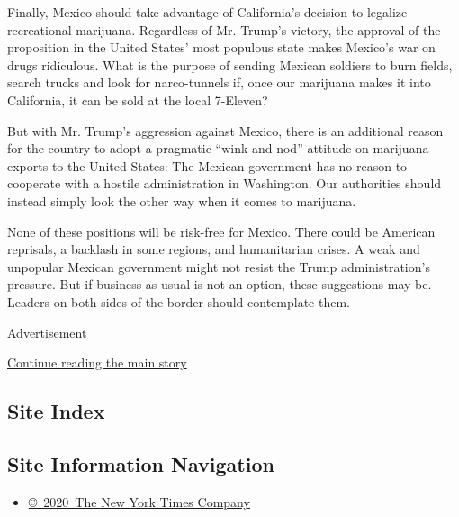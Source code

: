 Finally, Mexico should take advantage of California's decision to
legalize recreational marijuana. Regardless of Mr. Trump's victory, the
approval of the proposition in the United States' most populous state
makes Mexico's war on drugs ridiculous. What is the purpose of sending
Mexican soldiers to burn fields, search trucks and look for
narco-tunnels if, once our marijuana makes it into California, it can be
sold at the local 7-Eleven?

But with Mr. Trump's aggression against Mexico, there is an additional
reason for the country to adopt a pragmatic ``wink and nod'' attitude on
marijuana exports to the United States: The Mexican government has no
reason to cooperate with a hostile administration in Washington. Our
authorities should instead simply look the other way when it comes to
marijuana.

None of these positions will be risk-free for Mexico. There could be
American reprisals, a backlash in some regions, and humanitarian crises.
A weak and unpopular Mexican government might not resist the Trump
administration's pressure. But if business as usual is not an option,
these suggestions may be. Leaders on both sides of the border should
contemplate them.

Advertisement

\protect\hyperlink{after-bottom}{Continue reading the main story}

\hypertarget{site-index}{%
\subsection{Site Index}\label{site-index}}

\hypertarget{site-information-navigation}{%
\subsection{Site Information
Navigation}\label{site-information-navigation}}

\begin{itemize}
\tightlist
\item
  \href{https://help.nytimes3xbfgragh.onion/hc/en-us/articles/115014792127-Copyright-notice}{©~2020~The
  New York Times Company}
\end{itemize}

